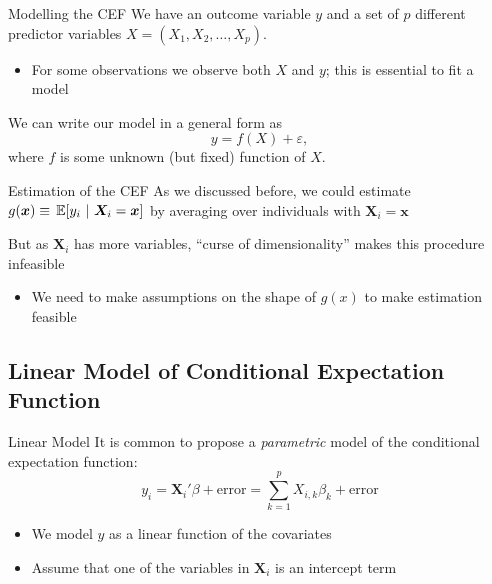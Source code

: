 \documentclass[aspectratio=169,t,11pt,table]{beamer}
\begin{document}
\begin{frame}{Modelling the CEF}
  We have an outcome variable $y$ and a set of $p$ different predictor variables $X = (X_1, X_2, \dots, X_p)$. 
  \begin{itemize}
    \item For some observations we observe both $X$ and $y$; this is essential to \alert{fit} a model
  \end{itemize}

  \bigskip
  We can write our model in a general form as
  $$
    y = f(X) + \varepsilon,
  $$
  where $f$ is some unknown (but fixed) function of $X$. 
\end{frame}

\begin{frame}{Estimation of the CEF}
  As we discussed before, we could estimate $g(\bm{x}) \equiv \expec{y_i}{\bm{X}_i = \bm{x}}$ by averaging over individuals with $\bm{X}_i = \bm{x}$

  \bigskip
  But as $\bm{X}_i$ has more variables, ``curse of dimensionality'' makes this procedure infeasible
  \begin{itemize}
    \item We need to make assumptions on the shape of $g(x)$ to make estimation feasible
  \end{itemize}
\end{frame}


\subsection{Linear Model of Conditional Expectation Function}

\begin{frame}{Linear Model}
  It is common to propose a \emph{parametric} model of the conditional expectation function:
  $$
    y_i = 
    \bm{X}_i' \beta + \text{error} = 
    \sum_{k=1}^p X_{i,k} \beta_k + \text{error}
  $$
  \begin{itemize}
    \item We model $y$ as a linear function of the covariates

    \item Assume that one of the variables in $\bm{X}_i$ is an intercept term
  \end{itemize}
\end{frame}
\end{document}
